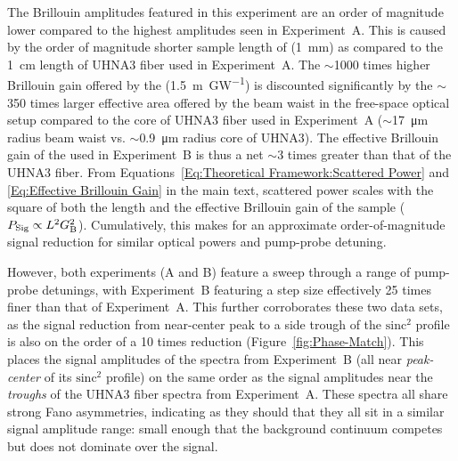 The Brillouin amplitudes featured in this experiment are an order of magnitude lower compared to the highest amplitudes seen in Experiment~A. This is caused by the order of magnitude shorter sample length of  (\SI{1}{\milli\meter}) as compared to the \SI{1}{\centi\meter} length of \ac{UHNA3} fiber used in Experiment~A. The \(\sim\)1000 times higher Brillouin gain offered by the  (\SI{1.5}{\meter\per\giga\watt}) is discounted significantly by the \(\sim\)350 times larger effective area offered by the beam waist in the free-space optical setup compared to the core of \ac{UHNA3} fiber used in Experiment~A (\(\sim\)\SI{17}{\micro\meter} radius beam waist vs. \(\sim\)\SI{0.9}{\micro\meter} radius core of UHNA3). The effective Brillouin gain of the  used in Experiment~B is thus a net \(\sim\)3 times greater than that of the \ac{UHNA3} fiber. From Equations~\ref{Eq:Theoretical Framework:Scattered Power} and \ref{Eq:Effective Brillouin Gain} in the main text, scattered power scales with the square of both the length and the effective Brillouin gain of the sample (\(P_{\rm Sig} \propto L^{2}G_{\rm B}^{2}\)). Cumulatively, this makes for an approximate order-of-magnitude signal reduction for similar optical powers and pump-probe detuning.

However, both experiments (A and B) feature a sweep through a range of pump-probe detunings, with Experiment~B featuring a step size effectively 25 times finer than that of Experiment~A. This further corroborates these two data sets, as the signal reduction from near-center peak to a side trough of the \(\mathrm{sinc^{2}}\) profile is also on the order of a 10 times reduction (Figure~\ref{fig:Phase-Match}). This places the signal amplitudes of the  spectra from Experiment~B (all near \textit{peak-center} of its \(\mathrm{sinc^{2}}\) profile) on the same order as the signal amplitudes near the \textit{troughs} of the UHNA3 fiber spectra from Experiment~A. These spectra all share strong Fano asymmetries, indicating as they should that they all sit in a similar signal amplitude range: small enough that the background continuum competes but does not dominate over the signal.

